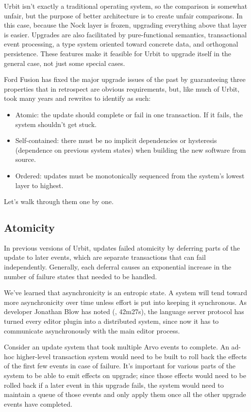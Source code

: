 \documentclass[twoside]{article}
\begin{document}
Urbit isn't exactly a traditional operating system, so the comparison is somewhat unfair, but the purpose of better architecture is to create unfair comparisons. In this case, because the Nock layer is frozen, upgrading everything above that layer is easier. Upgrades are also facilitated by pure-functional semantics, transactional event processing, a type system oriented toward concrete data, and orthogonal persistence. These features make it feasible for Urbit to upgrade
itself in the general case, not just some special cases.

Ford Fusion has fixed the major upgrade issues of the past by guaranteeing three properties that in retrospect are obvious requirements, but, like much of Urbit, took many years and rewrites to identify as such:

\begin{itemize}
  \item  Atomic: the update should complete or fail in one transaction. If it fails, the system shouldn't get stuck.
  \item  Self-contained: there must be no implicit dependencies or hysteresis (dependence on previous system states) when building the new software
  from source.
  \item  Ordered: updates must be monotonically sequenced from the system's lowest layer to highest.
\end{itemize}

Let’s walk through them one by one.

\subsection{Atomicity}

In previous versions of Urbit, updates failed atomicity by deferring parts of the update to later events, which are separate transactions that can fail independently. Generally, each deferral causes an exponential increase in the number of failure states that needed to be handled.

We've learned that asynchronicity is an entropic state. A system will tend toward more asynchronicity over time unless effort is put into keeping it synchronous. As developer Jonathan Blow has noted (\citet{Blow2019}, 42m27s), the language server protocol has turned every editor plugin into a distributed system, since now it has to communicate asynchronously with the main editor process.

Consider an update system that took multiple Arvo events to complete. An ad-hoc higher-level transaction system would need to be built to roll back the effects of the first few events in case of failure. It’s important for various parts of the system to be able to emit effects on upgrade; since those effects would need to be rolled back if a later event in this upgrade fails, the system would need to maintain a queue of those events and only apply them once all the other upgrade events have completed.
\end{document}
